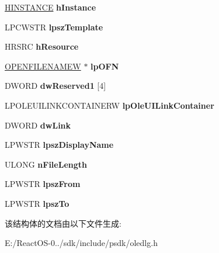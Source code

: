 \begin{DoxyCompactItemize}
\hyperlink{interfacevoid}{H\+I\+N\+S\+T\+A\+N\+CE} {\bfseries h\+Instance}
\item 
\mbox{\label{structtag_o_l_e_u_i_c_h_a_n_g_e_s_o_u_r_c_e_w_a4a45f072708454375ca360ea071e4cf3}} 
L\+P\+C\+W\+S\+TR {\bfseries lpsz\+Template}
\item 
\mbox{\label{structtag_o_l_e_u_i_c_h_a_n_g_e_s_o_u_r_c_e_w_a69e779a089920a5a4abf1ff3055af151}} 
H\+R\+S\+RC {\bfseries h\+Resource}
\item 
\mbox{\label{structtag_o_l_e_u_i_c_h_a_n_g_e_s_o_u_r_c_e_w_a0d2a4b5c6ba91a56f8f55a44ea32227f}} 
\hyperlink{structtag_o_f_n_w}{O\+P\+E\+N\+F\+I\+L\+E\+N\+A\+M\+EW} $\ast$ {\bfseries lp\+O\+FN}
\item 
\mbox{\label{structtag_o_l_e_u_i_c_h_a_n_g_e_s_o_u_r_c_e_w_abb6e9637a52193d55c73b894d9a5d9e6}} 
D\+W\+O\+RD {\bfseries dw\+Reserved1} \mbox{[}4\mbox{]}
\item 
\mbox{\label{structtag_o_l_e_u_i_c_h_a_n_g_e_s_o_u_r_c_e_w_a276b9b0fcc66a7d0df92001523aa6274}} 
L\+P\+O\+L\+E\+U\+I\+L\+I\+N\+K\+C\+O\+N\+T\+A\+I\+N\+E\+RW {\bfseries lp\+Ole\+U\+I\+Link\+Container}
\item 
\mbox{\label{structtag_o_l_e_u_i_c_h_a_n_g_e_s_o_u_r_c_e_w_ad99fcef6e1313cd131dff4f8314be896}} 
D\+W\+O\+RD {\bfseries dw\+Link}
\item 
\mbox{\label{structtag_o_l_e_u_i_c_h_a_n_g_e_s_o_u_r_c_e_w_ac7aa62034e374fe1ee6d861b092264f5}} 
L\+P\+W\+S\+TR {\bfseries lpsz\+Display\+Name}
\item 
\mbox{\label{structtag_o_l_e_u_i_c_h_a_n_g_e_s_o_u_r_c_e_w_a56e800882de8a7d79d255f9233d568c7}} 
U\+L\+O\+NG {\bfseries n\+File\+Length}
\item 
\mbox{\label{structtag_o_l_e_u_i_c_h_a_n_g_e_s_o_u_r_c_e_w_aea5dee61c33662c16469dd33949e4b93}} 
L\+P\+W\+S\+TR {\bfseries lpsz\+From}
\item 
\mbox{\label{structtag_o_l_e_u_i_c_h_a_n_g_e_s_o_u_r_c_e_w_a62ce7119a61418660c97bf4439c5c05f}} 
L\+P\+W\+S\+TR {\bfseries lpsz\+To}
\end{DoxyCompactItemize}


该结构体的文档由以下文件生成\+:\begin{DoxyCompactItemize}
\item 
E\+:/\+React\+O\+S-\/0../sdk/include/psdk/oledlg.\+h\end{DoxyCompactItemize}
